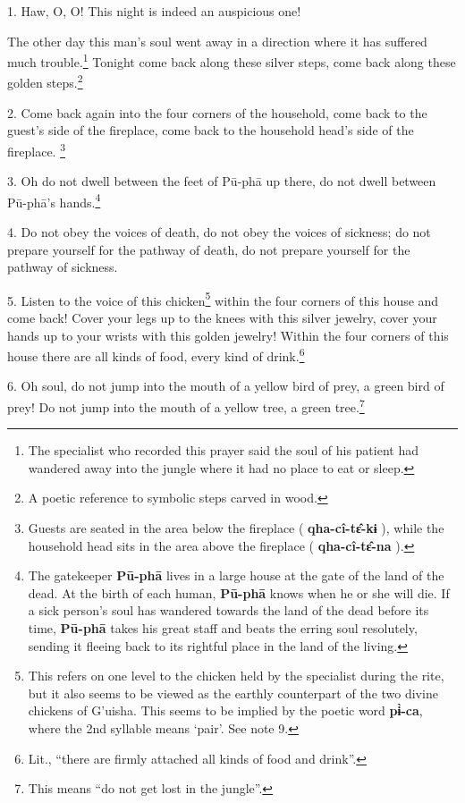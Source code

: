 \setcounter{footnote}{0}

1. Haw, O, O! This night is indeed an auspicious one!

The other day this man's soul went away in a direction where it has suffered much
trouble.\footnote{The specialist who recorded this prayer said the soul of his patient had wandered away into the jungle where it had no place to eat or sleep.} Tonight come back along these silver steps, come back along these
golden steps.\footnote{A poetic reference to symbolic steps carved in wood.}

2. Come back again into the four corners of the household, come back to the guest's
side of the fireplace, come back to the household head's side of the fireplace.
\footnote{Guests are seated in the area below the fireplace ( \textbf{qha-cî-tɛ̂-kɨ} ), while the household head sits in the area above the fireplace ( \textbf{qha-cî-tɛ̂-na} ).}

3. Oh do not dwell between the feet of Pū-phā up there, do not dwell between
Pū-phā's hands.\footnote{The gatekeeper \textbf{Pū-phā} lives in a large house at the gate of the land of the dead. At the birth of each human, \textbf{Pū-phā} knows when he or she will die. If a sick person's soul has wandered towards the land of the dead before its time, \textbf{Pū-phā} takes his great staff and beats the erring soul resolutely, sending it fleeing back to its rightful place in the land of the living.}

4. Do not obey the voices of death, do not obey the voices of sickness; do not prepare
yourself for the pathway of death, do not prepare yourself for the pathway of sickness.

5. Listen to the voice of this chicken\footnote{This refers on one level to the chicken held by the specialist during the rite, but it also seems to be viewed as the earthly counterpart of the two divine chickens of G'uisha. This seems to be implied by the poetic word \textbf{pɨ̀-ca}, where the 2nd syllable means `pair'. See note 9.} within the four corners of this house
and come back! Cover your legs up to the knees with this silver jewelry, cover
your hands up to your wrists with this golden jewelry! Within the four corners
of this house there are all kinds of food, every kind of drink.\footnote{Lit., ``there are firmly attached all kinds of food and drink''.}

6. Oh soul, do not jump into the mouth of a yellow bird of prey, a green bird of
prey! Do not jump into the mouth of a yellow tree, a green tree.\footnote{This means ``do not get lost in the jungle''.}

